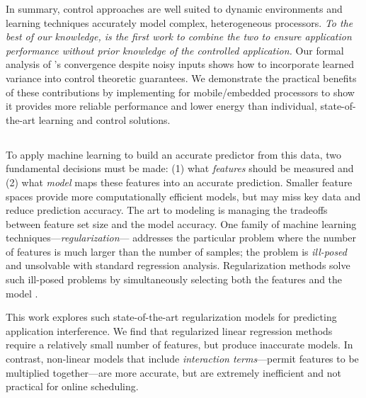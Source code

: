In summary, control approaches are well suited to dynamic environments
and learning techniques accurately model complex, heterogeneous
processors.  \emph{To the best of our knowledge, \SYSTEM{} is the
  first work to combine the two to ensure application performance
  without prior knowledge of the controlled application.}  Our formal
analysis of \SYSTEM{}'s convergence despite noisy inputs shows how to
incorporate learned variance into control theoretic guarantees.  We
demonstrate the practical benefits of these contributions by
implementing \SYSTEM{} for mobile/embedded processors to show it
provides more reliable performance and lower energy than individual,
state-of-the-art learning and control solutions.

\subsection{\SYSTEMESP{}}
To apply machine learning to build an
accurate predictor from this data, two fundamental decisions must be
made: (1) what \emph{features} should be measured and (2) what
\emph{model} maps these features into an accurate prediction.  Smaller
feature spaces provide more computationally efficient models, but
may miss key data and reduce prediction accuracy.  The art to modeling
is managing the tradeoffs between feature set size and the model
accuracy.  One family of machine learning
techniques---\emph{regularization}--- addresses the particular problem
where the number of features is much larger than the number of
samples; \ie the problem is \emph{ill-posed} and unsolvable with
standard regression analysis.  Regularization methods solve such
ill-posed problems by simultaneously selecting both the features and
the model
\cite{hoerl1988ridge,tibshirani1996regression,zou2005regularization}.

This work explores such state-of-the-art regularization models for
predicting application interference.  We find that regularized linear
regression methods require a relatively small number of features, but
produce inaccurate models.  In contrast, non-linear models that
include \emph{interaction terms}---\ie permit features to be
multiplied together---are more accurate, but are extremely inefficient
and not practical for online scheduling.

